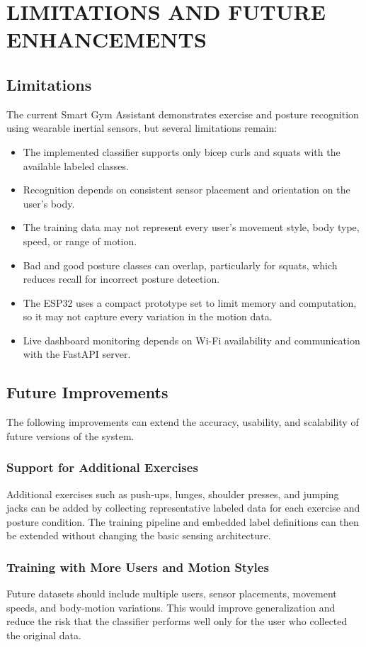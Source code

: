 \chapter{LIMITATIONS AND FUTURE ENHANCEMENTS}

\section{Limitations}
The current Smart Gym Assistant demonstrates exercise and posture recognition using
wearable inertial sensors, but several limitations remain:
\begin{itemize}
\item The implemented classifier supports only bicep curls and squats with the
      available labeled classes.
\item Recognition depends on consistent sensor placement and orientation on the
      user's body.
\item The training data may not represent every user's movement style, body type,
      speed, or range of motion.
\item Bad and good posture classes can overlap, particularly for squats, which
      reduces recall for incorrect posture detection.
\item The ESP32 uses a compact prototype set to limit memory and computation, so
      it may not capture every variation in the motion data.
\item Live dashboard monitoring depends on Wi-Fi availability and communication
      with the FastAPI server.
\end{itemize}

\section{Future Improvements}
The following improvements can extend the accuracy, usability, and scalability of
future versions of the system.

\subsection{Support for Additional Exercises}
Additional exercises such as push-ups, lunges, shoulder presses, and jumping jacks
can be added by collecting representative labeled data for each exercise and posture
condition. The training pipeline and embedded label definitions can then be extended
without changing the basic sensing architecture.

\subsection{Training with More Users and Motion Styles}
Future datasets should include multiple users, sensor placements, movement speeds,
and body-motion variations. This would improve generalization and reduce the risk
that the classifier performs well only for the user who collected the original data.

